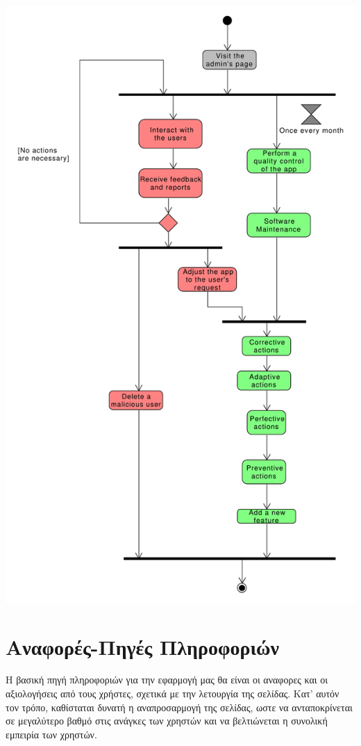 \documentclass[12pt]{article}
\begin{document}
\begin{center}
\includegraphics[scale=0.45]{adminActivityDiagram.pdf}
\end{center}


\section{Αναφορές-Πηγές Πληροφοριών}

Η βασική πηγή πληροφοριών για την εφαρμογή μας θα είναι οι αναφορες και οι αξιολογήσεις από τους χρήστες, σχετικά με την λετουργία της σελίδας. Κατ' αυτόν τον τρόπο, καθίσταται δυνατή η αναπροσαρμογή της σελίδας, ωστε να ανταποκρίνεται σε μεγαλύτερο βαθμό στις ανάγκες των χρηστών και να βελτιώνεται η συνολική εμπειρία των χρηστών. 
\end{document}
